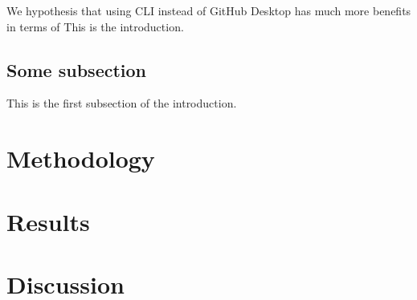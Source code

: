 \documentclass[]{report}
\begin{document}
	We hypothesis that using CLI instead of GitHub Desktop has much more benefits in terms of 
	This is the introduction.
	\subsection{Some subsection}
	
	This is the first subsection of the introduction.
	\section{Methodology}
	\lipsum
	\section{Results}
	\newpage	
	\section{Discussion}
\end{document}
